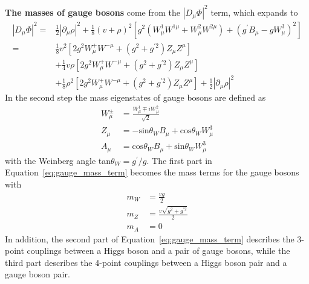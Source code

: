 \textbf{The masses of gauge bosons} come from the $|D_{\mu}\Phi|^2$ term, which expands to
\begin{equation}\label{eq:gauge_mass_term}
  \begin{split}
    |D_{\mu}\Phi|^{2} = & \frac{1}{2}|\partial_{\mu}\rho|^{2} 
                        + \frac{1}{8}(v+\rho)^{2} [g^{2}(W^{1}_{\mu}W^{1\mu} + W^{2}_{\mu}W^{2\mu}) + (g^{\prime}B_{\mu}-gW^{3}_{\mu})^{2}] \\
                      = & \frac{1}{8}v^{2} [2g^{2}W^{+}_{\mu}W^{-\mu} + (g^{2}+g^{\prime 2})Z_{\mu}Z^{\mu}] \\
                        & + \frac{1}{4}v\rho [2g^{2}W^{+}_{\mu}W^{-\mu} + (g^{2}+g^{\prime 2})Z_{\mu}Z^{\mu}] \\
                        & + \frac{1}{8}\rho^{2} [2g^{2}W^{+}_{\mu}W^{-\mu} + (g^{2}+g^{\prime 2})Z_{\mu}Z^{\mu}] + \frac{1}{2}|\partial_{\mu}\rho|^{2}
  \end{split}
\end{equation}
In the second step the mass eigenstates of gauge bosons are defined as  
\begin{equation}\label{eq:V_boson_def}
  \begin{split}
    W^{\pm}_{\mu} & = \frac{W^{1}_{\mu} \mp iW^{2}_{\mu}}{\sqrt{2}} \\
    Z_{\mu} & = -\text{sin}\theta_{W} B_{\mu} + \text{cos}\theta_{W} W^{3}_{\mu} \\
    A_{\mu} & = \text{cos}\theta_{W} B_{\mu} + \text{sin}\theta_{W} W^{3}_{\mu}
  \end{split}
\end{equation}
with the Weinberg angle tan$\theta_{W} = g^{\prime}/g$.
The first part in Equation~\ref{eq:gauge_mass_term} becomes the mass terms for the gauge bosons with
\begin{equation}\label{eq:gauge_mass}
  \begin{split}
    m_{W} & = \frac{vg}{2} \\
    m_{Z} & = \frac{v\sqrt{g^{2}+g^{\prime 2}}}{2} \\
    m_{A} & = 0
  \end{split}
\end{equation}
In addition, the second part of Equation~\ref{eq:gauge_mass_term} describes the 3-point couplings between a Higgs boson and a pair of gauge bosons,
while the third part describes the 4-point couplings between a Higgs boson pair and a gauge boson pair.

